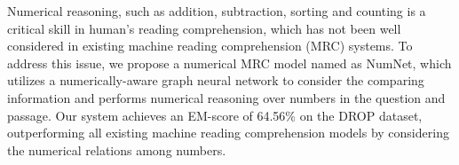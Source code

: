 Numerical reasoning, such as addition, subtraction, sorting and counting is a critical skill in human's reading comprehension, which has not been well considered in existing machine reading comprehension (MRC) systems. To address this issue, we propose a numerical MRC model named as NumNet, which utilizes a numerically-aware graph neural network to consider the comparing information and  performs numerical reasoning over numbers in the question and passage. Our system achieves an EM-score of 64.56\% on the DROP dataset, outperforming all existing machine reading comprehension models by considering the numerical relations among numbers.